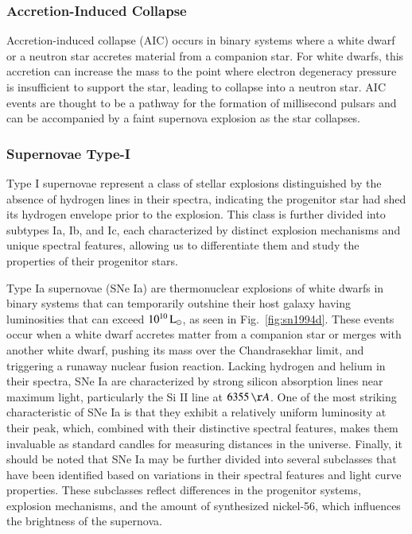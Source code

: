\documentclass[main.tex]{subfiles}
\begin{document}
    \subsubsection{Accretion-Induced Collapse}
    Accretion-induced collapse (AIC) occurs in binary systems where a white dwarf or a neutron star accretes material from a companion star. For white dwarfs, this accretion can increase the mass to the point where electron degeneracy pressure is insufficient to support the star, leading to collapse into a neutron star. AIC events are thought to be a pathway for the formation of millisecond pulsars and can be accompanied by a faint supernova explosion as the star collapses.
    \subsubsection{Supernovae Type-I}
    Type I supernovae represent a class of stellar explosions distinguished by the absence of hydrogen lines in their spectra, indicating the progenitor star had shed its hydrogen envelope prior to the explosion. This class is further divided into subtypes Ia, Ib, and Ic, each characterized by distinct explosion mechanisms and unique spectral features, allowing us to differentiate them and study the properties of their progenitor stars.

    Type Ia supernovae (SNe Ia) are thermonuclear explosions of white dwarfs in binary systems that can temporarily outshine their host galaxy having luminosities that can exceed $10^{10}\mathrm{\,L_\odot}$, as seen in Fig.~\ref{fig:sn1994d}. These events occur when a white dwarf accretes matter from a companion star or merges with another white dwarf, pushing its mass over the Chandrasekhar limit, and triggering a runaway nuclear fusion reaction. Lacking hydrogen and helium in their spectra, SNe Ia are characterized by strong silicon absorption lines near maximum light, particularly the Si II line at $6355\,\AA$. One of the most striking characteristic of SNe Ia is that they exhibit a relatively uniform luminosity at their peak, which, combined with their distinctive spectral features, makes them invaluable as standard candles for measuring distances in the universe. Finally, it should be noted that SNe Ia may be further divided into several subclasses that have been identified based on variations in their spectral features and light curve properties. These subclasses reflect differences in the progenitor systems, explosion mechanisms, and the amount of synthesized nickel-56, which influences the brightness of the supernova.
\end{document}

